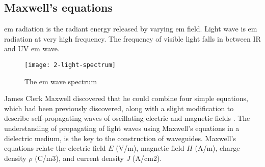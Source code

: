 \documentclass[../report.tex]{subfiles}
\begin{document}
		\subsection{Maxwell's equations}
\gls{em} radiation is the radiant energy released by varying \gls{em} field. Light wave is \gls{em} radiation at very high frequency. The frequency of visible light falls in between IR and UV \gls{em} wave. 
\begin{figure}[h]
	\centering
	\texttt{[image: 2-light-spectrum]}
	\caption{The \gls{em} wave spectrum}
	\label{fig:2_light_spectrum}
\end{figure}
James Clerk Maxwell discovered that he could combine four simple equations, which had been previously discovered, along with a slight modification to describe self-propagating waves of oscillating electric and magnetic fields \cite{waveparticle_2016}. The understanding of propagating of light waves using Maxwell's equations in a dielectric medium, is the key to the construction of waveguides. Maxwell’s equations relate the electric field $E$ (V/m), magnetic field $H$ (A/m), charge density $\rho$ (C/m3), and current density $J$ (A/cm2).
\end{document}
